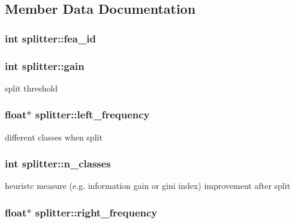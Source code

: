 \subsection{Member Data Documentation}
\hypertarget{classsplitter_ad093754efc111ae9dcb00e844b91e979}{
\subsubsection[{fea\+\_\+id}]{\setlength{\rightskip}{0pt plus 5cm}int splitter\+::fea\+\_\+id}}\label{classsplitter_ad093754efc111ae9dcb00e844b91e979}
\hypertarget{classsplitter_ab0fe2776184243f87a291917dca78261}{
\subsubsection[{gain}]{\setlength{\rightskip}{0pt plus 5cm}int splitter\+::gain}}\label{classsplitter_ab0fe2776184243f87a291917dca78261}
split threshold \hypertarget{classsplitter_a0a1c53a640e3305eeb32a9586fea657b}{
\subsubsection[{left\+\_\+frequency}]{\setlength{\rightskip}{0pt plus 5cm}float$\ast$ splitter\+::left\+\_\+frequency}}\label{classsplitter_a0a1c53a640e3305eeb32a9586fea657b}
different classes when split \hypertarget{classsplitter_abfc53538ed65c0afd50aedbf46dff458}{
\subsubsection[{n\+\_\+classes}]{\setlength{\rightskip}{0pt plus 5cm}int splitter\+::n\+\_\+classes}}\label{classsplitter_abfc53538ed65c0afd50aedbf46dff458}
heuristc measure (e.\+g. information gain or gini index) improvement after split \hypertarget{classsplitter_a8e1727de05ad39513dab201d6657aeed}{
\subsubsection[{right\+\_\+frequency}]{\setlength{\rightskip}{0pt plus 5cm}float$\ast$ splitter\+::right\+\_\+frequency}}\label{classsplitter_a8e1727de05ad39513dab201d6657aeed}
